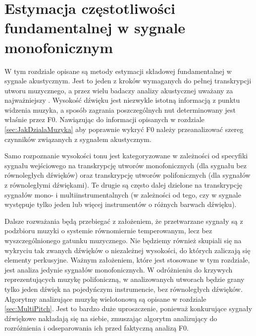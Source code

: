 \documentclass[12pt,a4paper,twoside]{mwart}
\begin{document}
\clearpage

\section{Estymacja częstotliwości fundamentalnej w sygnale monofonicznym}\label{sec:f0}
W tym rozdziale opisane są metody estymacji składowej fundamentalnej w sygnale akustycznym. Jest to jeden z kroków wymaganych do pełnej transkrypcji utworu muzycznego, a przez wielu badaczy analizy akustycznej uważany za najważniejszy 
\cite[408-415]{Transcription:Klapuri:ChallengesAndFuture}.
Wysokość dźwięku jest niezwykle istotną informacją z punktu widzenia muzyka, a sposób zagrania poszczególnych nut determinowany jest właśnie przez F0. Nawiązując do informacji opisanych w rozdziale \ref{sec:JakDzialaMuzyka} aby poprawnie wykryć F0 należy przeanalizować szereg czynników związanych z sygnałem akustycznym. 

Samo rozpoznanie wysokości tonu jest kategoryzowane w zależności od specyfiki sygnału wejściowego na transkrypcję utworów monofonicznych (dla sygnału bez równoległych dźwięków) oraz transkrypcję utworów polifonicznych (dla sygnałów z równoległymi dźwiękami). Te drugie są często dalej dzielone na transkrypcję sygnałów mono- i multiinstrumentalnych (w zależności od tego, czy w sygnale występuje tylko jeden lub więcej instrumentów o różnych barwach dźwięku).

Dalsze rozważania będą przebiegać z założeniem, że przetwarzane sygnały są z podzbioru muzyki o systemie równomiernie temperowanym, lecz bez wyszczególnionego gatunku muzycznego. Nie będziemy również skupiali się na wykryciu tak zwanych dźwięków o niezależnej wysokości, do których zaliczają się elementy perkusyjne. Ważnym założeniem, które jest stosowane w tym rozdziale, jest analiza jedynie sygnałów monofonicznych. W odróżnieniu do krzywych reprezentujących muzykę polifoniczną, w analizowanych utworach będzie grany tylko jeden dźwięk na pojedyńczym instrumencie, bez równoległych dźwięków. Algorytmy analizujące muzykę wielotonową są opisane w rozdziale \ref{sec:MultiPitch}. Jest to bardzo duże uproszczenie, ponieważ konkurujące sygnały dźwiękowe nakładają się na siebie, zmuszając algorytm analizujący do rozróżnienia i odseparowania ich przed faktyczną analizą F0. 
\end{document}
